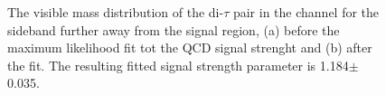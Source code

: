 \begin{figure}[h!]
\begin{center}
\end{center}
\caption{The visible mass distribution of the di-$\tau$ pair in the \mutau channel for the sideband further away from the signal region, (a) before
the maximum likelihood fit tot the QCD signal strenght and (b) after the fit. The resulting fitted signal strength parameter
is 1.184$\pm$0.035.}
\label{fig:mssm_qcdossss_mtfar}
\end{figure}

